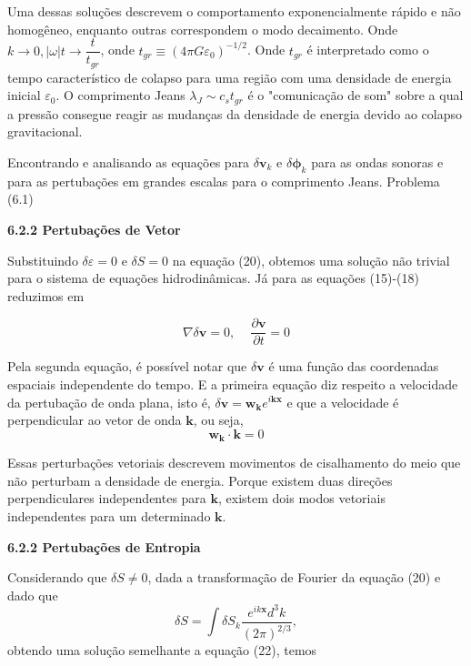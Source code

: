 \documentclass[a4paper,12pt]{article}
\begin{document}
 Uma dessas soluções descrevem o comportamento exponencialmente rápido e não homogêneo, enquanto outras correspondem o modo decaimento. Onde $k \to 0, |\omega | t \to \dfrac{t}{t_{gr}}$, onde $t_{gr} \equiv (4\pi G\varepsilon_0)^{-1/2}$. Onde $t_{gr}$ é interpretado como o tempo característico de colapso para uma região com uma densidade de energia inicial $\varepsilon_0$.
 O comprimento Jeans $\lambda_J \sim c_s t_{gr} $ é o "comunicação de som" sobre a qual a pressão consegue reagir as mudanças da densidade de energia devido ao colapso gravitacional.
 
 Encontrando e analisando as equações para $\delta\mathbf{v}_k$ e $\delta\mathbf{\phi}_k$ para as ondas sonoras e para as pertubações em grandes escalas para o comprimento Jeans.  Problema (6.1)
 
 \begin{center}
 	\textbf{6.2.2 Pertubações de Vetor}
 \end{center}
 Substituindo $\delta\varepsilon = 0$ e $\delta S = 0$ na equação (20), obtemos uma solução não trivial para o sistema de equações hidrodinâmicas. Já para as equações (15)-(18) reduzimos em
 
 \begin{equation}
 	\nabla \delta\mathbf{v} = 0 ,\,\,\,\,\,\,\, \dfrac{\partial \mathbf{v}}{\partial t} = 0
 \end{equation}

Pela segunda equação, é possível notar que $\delta\mathbf{v}$ é uma função das coordenadas espaciais independente do tempo. E a primeira equação diz respeito a velocidade da pertubação de onda plana, isto é, $\delta\mathbf{v} = \mathbf{w_k} e^{i\mathbf{k}\mathbf{x}}$ e que a velocidade é perpendicular ao vetor de onda $\mathbf{k}$, ou seja,
\begin{equation}
	\mathbf{w_k} \cdot \mathbf{k} = 0
\end{equation}

 Essas perturbações vetoriais descrevem movimentos de cisalhamento do meio que não perturbam a densidade de energia. Porque existem duas direções perpendiculares independentes para $\mathbf{k}$, existem dois modos vetoriais independentes para um determinado $\mathbf{k}$.
  \begin{center}
 	\textbf{6.2.2 Pertubações de Entropia}
 \end{center}

Considerando que $\delta S \neq 0$, dada a transformação de Fourier da equação (20) e dado que $$\delta S = \int \delta S_k \dfrac{e^{ik\textbf{x}}d^3 k}{(2\pi)^{2/3}}, $$ obtendo uma solução semelhante a equação (22), temos
\end{document}
